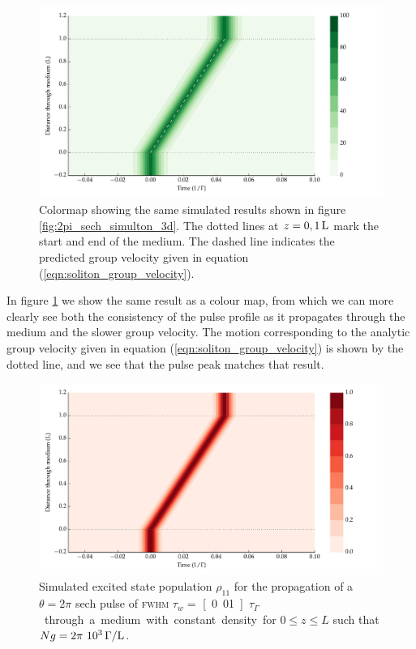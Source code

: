     \begin{figure}[]
      \includegraphics[width=\linewidth]
        {figs/03_nonlinear/coh_sech_2_0pi_fwhm0_010_Ng01000_fig1.pdf}
      \caption{
      Colormap showing the same simulated results shown in figure
      \ref{fig:2pi_sech_simulton_3d}. The dotted lines at $z = \unit[0, 1]{L}$
      mark the start and end of the medium. The dashed line indicates the
      predicted group velocity given in equation
      (\ref{eqn:soliton_group_velocity}).
      }
      \label{fig:2pi_sech_simulton}
    \end{figure}

    In figure \ref{fig:2pi_sech_simulton} we show the same result as a colour
    map, from which we can more clearly see both the consistency of the pulse
    profile as it propagates through the medium and the slower group velocity.
    The motion corresponding to the analytic group velocity given in equation
    (\ref{eqn:soliton_group_velocity}) is shown by the dotted line, and we see
    that the pulse peak matches that result.

    \begin{figure}[]
      \includegraphics[width=\linewidth]
        {figs/03_nonlinear/coh_sech_2_0pi_fwhm0_010_Ng01000_fig2.pdf}
      \caption{
        Simulated excited state population $\rho_{11}$ for the propagation of a
        $\theta = 2\pi$ sech pulse of \textsc{fwhm} $\tau_w = $
        \unit[0.01]{$\tau_\Gamma$} through a medium with constant density for $0
        \le z \le L$ such that $Ng = \unit[2\pi~10^3]{\Gamma/L}$.
      }
      \label{fig:2pi_sech_simulton_pop}
    \end{figure}

